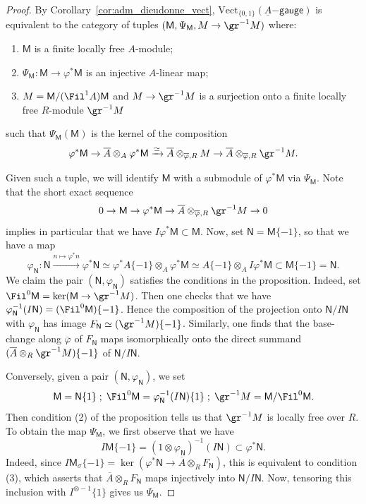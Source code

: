 \documentclass[10pt]{amsart}
\begin{document}
\begin{proof}
By Corollary~\ref{cor:adm_dieudonne_vect}, $\mathrm{Vect}_{\{0,1\}}(\underline{A}\mathsf{-gauge})$ is equivalent to the category of tuples $(\mathsf{M},\Psi_{\mathsf{M}},M\to \gr^{-1}M)$ where:
\begin{enumerate}
   \item $\mathsf{M}$ is a finite locally free $A$-module;
   \item $\Psi_{\mathsf{M}}:\mathsf{M}\to \varphi^*\mathsf{M}$ is an injective $A$-linear map;
   \item  $M = \mathsf{M}/(\Fil^1A)\mathsf{M}$ and $M\to \gr^{-1}M$ is a surjection onto a finite locally free $R$-module $\gr^{-1}M$
\end{enumerate}
such that $\Psi_{\mathsf{M}}(\mathsf{M})$ is the kernel of the composition
\[
\varphi^*\mathsf{M}\to \overline{A}\otimes_A\varphi^*\mathsf{M}\xrightarrow{\simeq}\overline{A}\otimes_{\overline{\varphi},R}M \to \overline{A}\otimes_{\overline{\varphi},R}\gr^{-1}M.
\]

Given such a tuple, we will identify $\mathsf{M}$ with a submodule of $\varphi^*\mathsf{M}$ via $\Psi_{\mathsf{M}}$. Note that the short exact sequence 
\[
0\to \mathsf{M}\to \varphi^*\mathsf{M}\to \overline{A}\otimes_{\overline\varphi,R}\gr^{-1}M\to 0
\]
implies in particular that we have $I\varphi^*\mathsf{M}\subset \mathsf{M}$. Now, set $\mathsf{N} = \mathsf{M}\{-1\}$, so that we have a map
\[
\varphi_{\mathsf{N}}:\mathsf{N}\xrightarrow{n\mapsto \varphi^*n}\varphi^*\mathsf{N} \simeq \varphi^* A\{-1\}\otimes_A\varphi^*\mathsf{M} \simeq A\{-1\}\otimes_AI\varphi^*\mathsf{M}\subset \mathsf{M}\{-1\} = \mathsf{N}.
\]
We claim the pair $(\mathsf{N},\varphi_{\mathsf{N}})$ satisfies the conditions in the proposition. Indeed, set $\Fil^0\mathsf{M} = \ker(\mathsf{M}\to \gr^{-1}M)$. Then one checks that we have $\varphi_{\mathsf{N}}^{-1}(I\mathsf{N}) = (\Fil^0\mathsf{M})\{-1\}$. Hence the composition of the projection onto $\mathsf{N}/I\mathsf{N}$ with $\varphi_{\mathsf{N}}$ has image $F_{\mathsf{N}}\simeq (\gr^{-1}M)\{-1\}$. Similarly, one finds that the base-change  along $\overline\varphi$ of $F_{\mathsf{N}}$ maps isomorphically onto the direct summand $(\overline{A}\otimes_R\gr^{-1}M)\{-1\}$ of $\mathsf{N}/I\mathsf{N}$.

Conversely, given a pair $(\mathsf{N},\varphi_{\mathsf{N}})$, we set 
\[
\mathsf{M} = \mathsf{N}\{1\}\;;\;\Fil^0\mathsf{M} =\varphi_{\mathsf{N}}^{-1}(I\mathsf{N})\{1\}\;;\; \gr^{-1}M = \mathsf{M}/\Fil^0\mathsf{M}. 
\]
Then condition (2) of the proposition tells us that $\gr^{-1}M$ is locally free over $R$. To obtain the map $\Psi_{\mathsf{M}}$, we first observe that we have
\[
I\mathsf{M}\{-1\} = (1\otimes\varphi_{\mathsf{N}})^{-1}(I\mathsf{N})\subset \varphi^*\mathsf{N}. 
\]
Indeed, since $I\mathsf{M}_{\sigma}\{-1\}=\ker(\varphi^*\mathsf{N}\to \overline{A}\otimes_{R}F_{\mathsf{N}})$, this is equivalent to condition (3), which asserts that $\overline{A}\otimes_{R}F_{\mathsf{N}}$ maps injectively into $\mathsf{N}/I\mathsf{N}$. Now, tensoring this inclusion with $I^{\otimes -1}\{1\}$ gives us $\Psi_{\mathsf{M}}$.
\end{proof}
\end{document}
